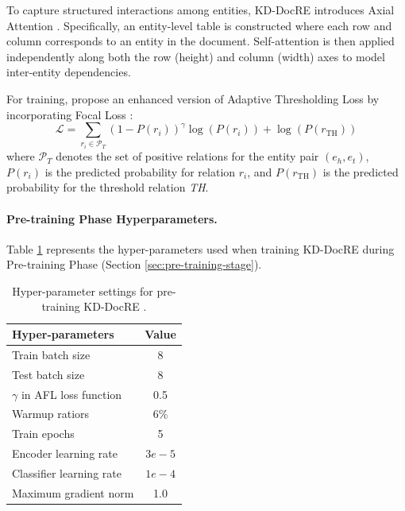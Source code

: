 To capture structured interactions among entities, KD-DocRE introduces Axial Attention \citep{ho2019axial}. Specifically, an entity-level table is constructed where each row and column corresponds to an entity in the document. Self-attention \citep{vaswani2017attention} is then applied independently along both the row (height) and column (width) axes to model inter-entity dependencies.

For training, \citet{tan2022document} propose an enhanced version of Adaptive Thresholding Loss \citep{zhou2021document} by incorporating Focal Loss \citep{lin2017focal}:
\begin{equation}
    \mathcal{L} = \sum_{r_i \in \mathcal{P}_T}\left( 1 - P(r_i)\right)^\gamma \log\left(P(r_i)\right) + \log\left(P(r_{\text{TH}})\right)
\end{equation}
where $\mathcal{P}_T$ denotes the set of positive relations for the entity pair $(e_h, e_t)$, $P(r_i)$ is the predicted probability for relation $r_i$, and $P(r_{\text{TH}})$ is the predicted probability for the threshold relation \textit{TH}.
 
\paragraph{Pre-training Phase Hyperparameters.}
Table \ref{tab:hyper-params-pretrain-kddocre} represents the hyper-parameters used when training KD-DocRE during Pre-training Phase (Section \ref{sec:pre-training-stage}).
\begin{table}[!h]
  \centering
  \begin{tabular}{lc}
    \toprule
    \textbf{Hyper-parameters}           & \textbf{Value}\\
    \midrule
    Train batch size                    & 8             \\
    Test batch size                     & 8             \\
    $\gamma$ in AFL loss function       & 0.5           \\
    Warmup ratiors                      & 6\%           \\
    Train epochs                        & 5             \\ 
    Encoder learning rate               & $3e-5$        \\
    Classifier learning rate            & $1e-4$        \\
    Maximum gradient norm               & 1.0           \\  \bottomrule
  \end{tabular}
  \caption{Hyper-parameter settings for pre-training KD-DocRE \citep{tan2022document}.}
  \label{tab:hyper-params-pretrain-kddocre}
\end{table}

